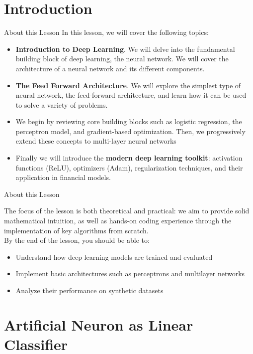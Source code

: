 \documentclass[aspectratio=169]{beamer}
\begin{document}
\section{Introduction}
%
\begin{frame}{About this Lesson}
In this lesson, we will cover the following topics:
\begin{itemize}
\item \textbf{Introduction to Deep Learning}. We will delve into the fundamental building block of deep learning, the neural network. We will cover the architecture of a neural network and its different components.
\item \textbf{The Feed Forward Architecture}. We will explore the simplest type of neural network, the feed-forward architecture, and learn how it can be used to solve a variety of problems. 
\item We begin by reviewing core building blocks such as logistic regression, the perceptron model, and gradient-based optimization. Then, we progressively extend these concepts to multi-layer neural networks
\item  Finally we will introduce the \textbf{modern deep learning toolkit}: activation functions (ReLU), optimizers (Adam), regularization techniques, and their application in financial models.
\end{itemize}
\end{frame}
%
%
\begin{frame}{About this Lesson}

The focus of the lesson is both theoretical and practical: we aim to provide solid mathematical intuition, as well as hands-on coding experience through the implementation of key algorithms from scratch.
\\
\vspace {1cm}
By the end of the lesson, you should be able to:
\begin{itemize}
    \item Understand how deep learning models are trained and evaluated
    \item Implement basic architectures such as perceptrons and multilayer networks
    \item Analyze their performance on synthetic datasets
\end{itemize}
\end{frame}
%
\section{Artificial Neuron as Linear Classifier}
%
%
\end{document}
